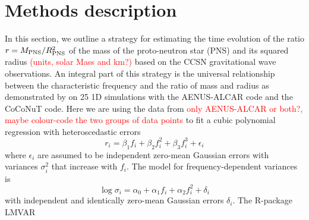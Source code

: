 \section{Methods description}
In this section, we outline a strategy for estimating the time evolution of the ratio $r=M_{\rm PNS}/R_{\rm PNS}^2$ of the mass of the proto-neutron star (PNS) and its squared radius \textcolor{red}{(units, solar Mass and km?)} based on
the CCSN gravitational wave observations.
An integral part of this strategy is the universal relationship between the characteristic frequency and the ratio of mass and radius as demonstrated by  \cite{Torres:2019}
on 25 1D simulations with the
{\sc AENUS-ALCAR }code \cite{} and the {\sc CoCoNuT} \cite{} code. Here we are using the data from \textcolor{red}{only {\sc AENUS-ALCAR} or both?, maybe colour-code the two groups of data points } to fit a cubic polynomial regression with
heteroscedastic errors
\begin{equation}
r_i=\beta_1 f_i + \beta_2 f_i^2 +\beta_3 f_i^3 + \epsilon_i
\end{equation}
where $\epsilon_i$ are assumed to be independent zero-mean Gaussian errors with  variances $\sigma_i^2$ that increase with $f_i$. The model for frequency-dependent variances is
\begin{equation}
\log \sigma_i=\alpha_0+ \alpha_1 f_i + \alpha_2 f_i^2 + \delta_i
\end{equation}
with independent and identically zero-mean Gaussian errors $\delta_i$. The R-package LMVAR
